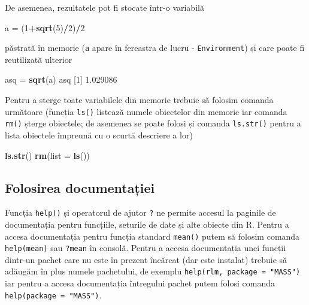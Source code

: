 \documentclass[]{article}
\newenvironment{Shaded}{\begin{snugshade}}{\end{snugshade}}
\newcommand{\KeywordTok}[1]{\textcolor[rgb]{0.13,0.29,0.53}{\textbf{#1}}}
\newcommand{\DataTypeTok}[1]{\textcolor[rgb]{0.13,0.29,0.53}{#1}}
\newcommand{\DecValTok}[1]{\textcolor[rgb]{0.00,0.00,0.81}{#1}}
\newcommand{\FloatTok}[1]{\textcolor[rgb]{0.00,0.00,0.81}{#1}}
\newcommand{\StringTok}[1]{\textcolor[rgb]{0.31,0.60,0.02}{#1}}
\newcommand{\OperatorTok}[1]{\textcolor[rgb]{0.81,0.36,0.00}{\textbf{#1}}}
\newcommand{\NormalTok}[1]{#1}
\begin{document}
De asemenea, rezultatele pot fi stocate într-o variabilă

\begin{Shaded}
\begin{Highlighting}[]
\NormalTok{a =}\StringTok{ }\NormalTok{(}\DecValTok{1}\OperatorTok{+}\KeywordTok{sqrt}\NormalTok{(}\DecValTok{5}\NormalTok{)}\OperatorTok{/}\DecValTok{2}\NormalTok{)}\OperatorTok{/}\DecValTok{2}
\end{Highlighting}
\end{Shaded}

păstrată în memorie (\texttt{a} apare în fereastra de lucru -
\texttt{Environment}) și care poate fi reutilizată ulterior

\begin{Shaded}
\begin{Highlighting}[]
\NormalTok{asq =}\StringTok{ }\KeywordTok{sqrt}\NormalTok{(a)}
\NormalTok{asq}
\NormalTok{[}\DecValTok{1}\NormalTok{] }\FloatTok{1.029086}
\end{Highlighting}
\end{Shaded}

Pentru a șterge toate variabilele din memorie trebuie să folosim comanda
următoare (funcția \texttt{ls()} listează numele obiectelor din memorie
iar comanda \texttt{rm()} șterge obiectele; de asemenea se poate folosi
și comanda \texttt{ls.str()} pentru a lista obiectele împreună cu o
scurtă descriere a lor)

\begin{Shaded}
\begin{Highlighting}[]
\KeywordTok{ls.str}\NormalTok{()}
\KeywordTok{rm}\NormalTok{(}\DataTypeTok{list =} \KeywordTok{ls}\NormalTok{())}
\end{Highlighting}
\end{Shaded}

\subsection{Folosirea documentației}\label{folosirea-documentatiei}

Funcția \texttt{help()} și operatorul de ajutor \texttt{?} ne permite
accesul la paginile de documentația pentru funcțiile, seturile de date
și alte obiecte din R. Pentru a accesa documentația pentru funcția
standard \texttt{mean()} putem să folosim comanda \texttt{help(mean)}
sau \texttt{?mean} în consolă. Pentru a accesa documentația unei funcții
dintr-un pachet care nu este în prezent încărcat (dar este instalat)
trebuie să adăugăm în plus numele pachetului, de exemplu
\texttt{help(rlm,\ package\ =\ "MASS")} iar pentru a accesa documentația
întregului pachet putem folosi comanda
\texttt{help(package\ =\ "MASS")}.
\end{document}
